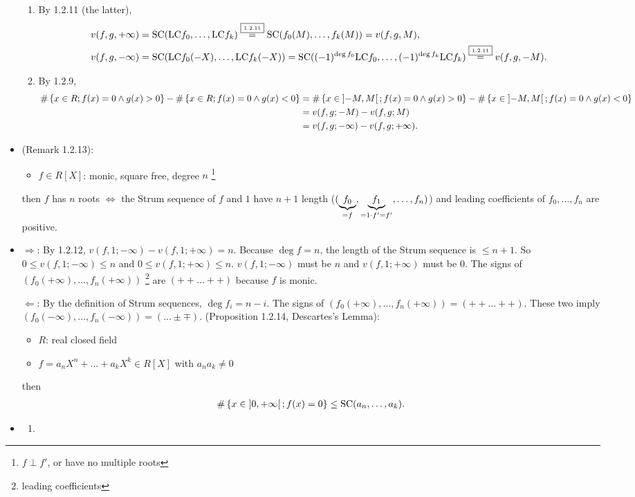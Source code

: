 \documentclass[9pt]{ltjsarticle}
\begin{document}
\begin{itemize}
\begin{enumerate}
    \item
    By 1.2.11 (the latter),
    \begin{align}
      v(f,g,+\infty) &= \mathrm{SC}({\rm LC} f_0,\dots,{\rm LC} f_k)
      \overset{\text{\fbox{\tiny 1.2.11}}}{=}
      \mathrm{SC}(f_0(M),\dots,f_k(M))
      =
      v(f,g,M),\\
      v(f,g,-\infty) &=
      \mathrm{SC}({\rm LC} f_0(-X),\dots,{\rm LC} f_k(-X))
      =
      \mathrm{SC}((-1)^{\deg f_0} {\rm LC} f_0,\dots, (-1)^{\deg f_k} {\rm LC} f_k)
      \overset{\text{\fbox{\tiny 1.2.11}}}{=}
      v(f,g,-M).
    \end{align}
    \item
    By 1.2.9,
    \begin{align}
      \# \left\{x\in R; f(x)=0 \land g(x)>0\right\} - \# \left\{x\in R; f(x)=0 \land g(x)<0\right\}
      &=
      \# \left\{x\in \left] -M,M \right[; f(x)=0 \land g(x)>0\right\} - \# \left\{x\in \left] -M,M \right[; f(x)=0 \land g(x)<0\right\}\\
      &=
      v(f,g;-M) - v(f,g;M)\\
      &=
      v(f,g;-\infty) - v(f,g;+\infty).
    \end{align}
  \end{enumerate}
  \item
  (Remark 1.2.13):
  \begin{itemize}
    \item $f\in R[X]$: monic, square free, degree $n$ \footnote{$f\perp f'$, or have no multiple roots}
  \end{itemize}
  then
  $f$ has $n$ roots $\iff$
  the Strum sequence of $f$ and $1$ have $n+1$ length ($(\underbrace{f_0}_{=f},\underbrace{f_1}_{=1\cdot f' = f'},\dots,f_n)$) and
  leading coefficients of $f_0,\dots,f_n$ are positive.
  \item
  \pf
  $\Rightarrow$:
  By 1.2.12, $v(f,1;-\infty)-v(f,1;+\infty)=n$.
  Because $\deg f = n$, the length of the Strum sequence is $\le n+1$.
  So $0\le v(f,1;-\infty)\le n$ and $0\le v(f,1;+\infty) \le n$.
  $v(f,1;-\infty)$ must be $n$ and $v(f,1;+\infty)$ must be $0$.
  The signs of $(f_0(+\infty),\dots,f_n(+\infty))$ \footnote{leading coefficients}
  are $(++\dots ++)$ because $f$ is monic.

  $\Leftarrow$:
  By the definition of Strum sequences,
  $\deg f_i = n - i$.  The signs of
  $(f_0(+\infty),\dots,f_n(+\infty)) = (++\dots ++)$.
  These two imply $(f_0(-\infty),\dots,f_n(-\infty)) = (\dots \pm \mp)$.
  \iem
  (Proposition 1.2.14, Descartes's Lemma):
  \begin{itemize}
    \item $R$: real closed field
    \item $f=a_n X^n + \dots + a_k X^k \in R[X]$ with $a_n a_k \neq 0$
  \end{itemize}
  then
  \begin{align}
    \# \left\{x \in \left] 0,+\infty \right[; f(x)=0\right\} \le \mathrm{SC}(a_n,\dots,a_k).
  \end{align}
  \item
  \pf
  \begin{enumerate}
    \item 
  \end{enumerate}
\end{itemize}
\end{document}
